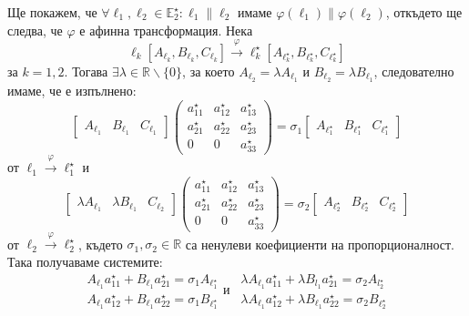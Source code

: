 \documentclass[12pt]{article}
\begin{document}
Ще покажем, че $\forall \ell_1,\ell_2\in\mathbb{E}_2^\star:\ell_1\parallel \ell_2$ имаме $\varphi(\ell_1)\parallel \varphi(\ell_2)$, откъдето ще следва, че $\varphi$ е афинна трансформация. Нека $$\ell_k[A_{\ell_k},B_{\ell_k},C_{\ell_k}]\xrightarrow{\varphi}\ell_k^\star[A_{\ell_k^\star},B_{\ell_k^\star},C_{\ell_k^\star}]$$ за $k=1,2$. Тогава $\exists \lambda\in\mathbb{R}\backslash\{0\}$, за което $A_{\ell_2}=\lambda A_{\ell_1}$ и $B_{\ell_2}=\lambda B_{\ell_1}$, следователно имаме, че е изпълнено: $$\begin{bmatrix} A_{\ell_1} & B_{\ell_1} & C_{\ell_1}\end{bmatrix}\begin{pmatrix}a_{11}^\star & a_{12}^\star & a_{13}^\star \\ a_{21}^\star & a_{22}^\star & a_{23}^\star \\ 0 & 0 & a_{33}^\star \end{pmatrix}=\sigma_1 \begin{bmatrix} A_{\ell_1^\star} & B_{\ell_1^\star} & C_{\ell_1^\star}\end{bmatrix} $$ от $\ell_1\xrightarrow{\varphi}  \ell_1^\star$ и $$\begin{bmatrix} \lambda A_{\ell_1} & \lambda B_{\ell_1} & C_{\ell_2}\end{bmatrix} \begin{pmatrix}a_{11}^\star & a_{12}^\star & a_{13}^\star \\ a_{21}^\star & a_{22}^\star & a_{23}^\star \\ 0 & 0 & a_{33}^\star \end{pmatrix}=\sigma_2 \begin{bmatrix} A_{\ell_2^\star} & B_{\ell_2^\star} & C_{\ell_2^\star}\end{bmatrix}$$ от $\ell_2\xrightarrow{\varphi}  \ell_2^\star$, където $\sigma_1,\sigma_2\in\mathbb{R}$ са ненулеви коефициенти на пропорционалност. Така получаваме системите: $$\begin{array}{|l}A_{\ell_1}a_{11}^\star +B_{\ell_1}a_{21}^\star=\sigma_1 A_{\ell_1^\star}\\ A_{\ell_1}a_{12}^\star +B_{\ell_1}a_{22}^\star=\sigma_1 B_{\ell_1^\star}\end{array} \text{и}\ \ \begin{array}{|l}\lambda A_{\ell_1}a_{11}^\star +\lambda B_{l_1}a_{21}^\star=\sigma_2 A_{l_2^\star}\\ \lambda A_{\ell_1}a_{12}^\star +\lambda B_{\ell_1}a_{22}^\star=\sigma_2 B_{\ell_2^\star}\end{array}$$
\end{document}

